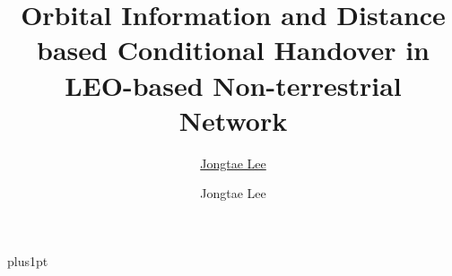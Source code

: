 \documentclass[oneside,12pt]{classfile/PhDthesisPSnPDF}
\title{Orbital Information and Distance based Conditional Handover in LEO-based Non-terrestrial Network}
\author{\href{mailto:jtlee830@ajou.ac.kr}{Jongtae Lee}}
\author{Jongtae Lee}
\begin{document}
\renewcommand{\figurename}{Fig.}


\renewcommand\baselinestretch{1.5}
\baselineskip=18pt plus1pt


%






% 
% 
% 

%
%

\normalsize 




%


\frontmatter

\setcounter{page}{1}

\end{document}
